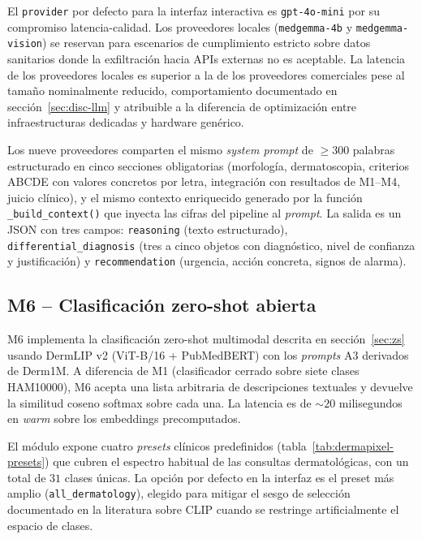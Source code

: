 El \texttt{provider} por defecto para la interfaz interactiva es
\texttt{gpt-4o-mini} por su compromiso latencia-calidad. Los
proveedores locales (\texttt{medgemma-4b} y
\texttt{medgemma-vision}) se reservan para escenarios de
cumplimiento estricto sobre datos sanitarios donde la
exfiltración hacia APIs externas no es aceptable. La latencia de
los proveedores locales es superior a la de los proveedores
comerciales pese al tamaño nominalmente reducido, comportamiento
documentado en secci\'on~\ref{sec:disc-llm} y atribuible a la diferencia
de optimización entre infraestructuras dedicadas y hardware
genérico.

Los nueve proveedores comparten el mismo \emph{system prompt} de
$\geq 300$ palabras estructurado en cinco secciones obligatorias
(morfología, dermatoscopia, criterios ABCDE con valores concretos
por letra, integración con resultados de M1--M4, juicio clínico),
y el mismo contexto enriquecido generado por la función
\texttt{\_build\_context()} que inyecta las cifras del pipeline al
\emph{prompt}. La salida es un JSON con tres campos:
\texttt{reasoning} (texto estructurado), \texttt{differential\_diagnosis}
(tres a cinco objetos con diagnóstico, nivel de confianza y
justificación) y \texttt{recommendation} (urgencia, acción
concreta, signos de alarma).

\subsection{M6 -- Clasificación zero-shot abierta}
\label{sec:dermapixel-m6}

M6 implementa la clasificación zero-shot multimodal descrita en
secci\'on~\ref{sec:zs} usando DermLIP v2 (ViT-B/16 + PubMedBERT) con los
\emph{prompts} A3 derivados de Derm1M. A diferencia de M1
(clasificador cerrado sobre siete clases HAM10000), M6 acepta una
lista arbitraria de descripciones textuales y devuelve la similitud
coseno softmax sobre cada una. La latencia es de
$\sim 20$ milisegundos en \emph{warm} sobre los embeddings
precomputados.

El módulo expone cuatro \emph{presets} clínicos predefinidos
(tabla~\ref{tab:dermapixel-presets}) que cubren el espectro habitual
de las consultas dermatológicas, con un total de $31$ clases
únicas. La opción por defecto en la interfaz es el preset más
amplio (\texttt{all\_dermatology}), elegido para mitigar el sesgo
de selección documentado en la literatura sobre CLIP cuando se
restringe artificialmente el espacio de clases.

